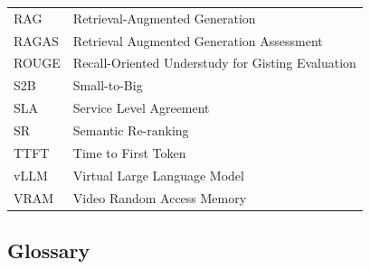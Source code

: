 \begin{tabular}{ll}
RAG         & Retrieval-Augmented Generation \\
RAGAS       & Retrieval Augmented Generation Assessment \\
ROUGE       & Recall-Oriented Understudy for Gisting Evaluation \\
S2B         & Small-to-Big \\
SLA         & Service Level Agreement \\
SR          & Semantic Re-ranking \\
TTFT        & Time to First Token \\
vLLM        & Virtual Large Language Model \\
VRAM        & Video Random Access Memory \\
\end{tabular}

\vspace{0.6cm}

\subsection*{Glossary}

